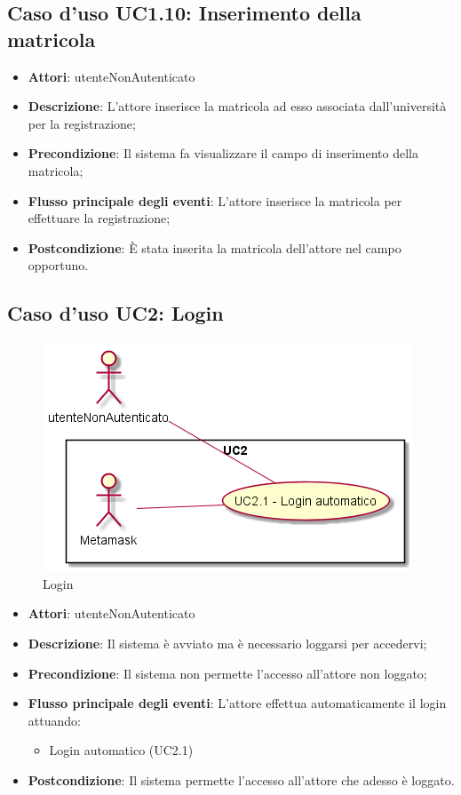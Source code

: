 \subsection{Caso d'uso \texorpdfstring{UC1.10}{UC1.10}: Inserimento della matricola}
\begin{itemize}
\item \textbf{Attori}: utenteNonAutenticato
\item \textbf{Descrizione}: L'attore inserisce la matricola ad esso associata dall'università per la registrazione;
\item \textbf{Precondizione}: Il sistema fa visualizzare il campo di inserimento della matricola;
\item \textbf{Flusso principale degli eventi}: L'attore inserisce la matricola per effettuare la registrazione;
\item \textbf{Postcondizione}: È stata inserita la matricola dell'attore nel campo opportuno.
\end{itemize}
\subsection{Caso d'uso \texorpdfstring{UC2}{UC2}: Login}
\begin{figure} [H]
\centering
\includegraphics[scale=0.45]{./img/UC2.png}
\caption{Login}\label{}
\end{figure}
\begin{itemize}
\item \textbf{Attori}: utenteNonAutenticato
\item \textbf{Descrizione}: Il sistema è avviato ma è necessario loggarsi per accedervi;
\item \textbf{Precondizione}: Il sistema non permette l'accesso all'attore non loggato;
\item \textbf{Flusso principale degli eventi}: L'attore effettua automaticamente il login attuando:
\begin{itemize}
\item Login automatico (UC2.1)
\end{itemize}
\item \textbf{Postcondizione}: Il sistema permette l'accesso all'attore che adesso è loggato.
\end{itemize}
